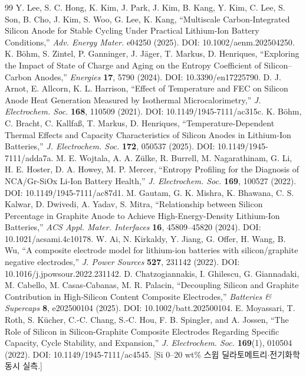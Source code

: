 \begin{thebibliography}{99}
 Y. Lee, S. C. Hong, K. Kim, J. Park, J. Kim, B. Kang, Y. Kim, C. Lee, S. Son, B. Cho, J. Kim, S. Woo, G. Lee, K. Kang, ``Multiscale Carbon‐Integrated Silicon Anode for Stable Cycling Under Practical Lithium‐Ion Battery Conditions,'' \emph{Adv. Energy Mater.} e04250 (2025). DOI: 10.1002/aenm.202504250.
 K. Böhm, S. Zintel, P. Ganninger, J. Jäger, T. Markus, D. Henriques, ``Exploring the Impact of State of Charge and Aging on the Entropy Coefficient of Silicon–Carbon Anodes,'' \emph{Energies} \textbf{17}, 5790 (2024). DOI: 10.3390/en17225790.
 D. J. Arnot, E. Allcorn, K. L. Harrison, ``Effect of Temperature and FEC on Silicon Anode Heat Generation Measured by Isothermal Microcalorimetry,'' \emph{J. Electrochem. Soc.} \textbf{168}, 110509 (2021). DOI: 10.1149/1945-7111/ac315c.
 K. Böhm, C. Bracht, C. Kallfaß, T. Markus, D. Henriques, ``Temperature-Dependent Thermal Effects and Capacity Characteristics of Silicon Anodes in Lithium-Ion Batteries,'' \emph{J. Electrochem. Soc.} \textbf{172}, 050537 (2025). DOI: 10.1149/1945-7111/adda7a.
 M. E. Wojtala, A. A. Zülke, R. Burrell, M. Nagarathinam, G. Li, H. E. Hoster, D. A. Howey, M. P. Mercer, ``Entropy Profiling for the Diagnosis of NCA/Gr-SiOx Li-Ion Battery Health,'' \emph{J. Electrochem. Soc.} \textbf{169}, 100527 (2022). DOI: 10.1149/1945-7111/ac87d1.
 M. Gautam, G. K. Mishra, K. Bhawana, C. S. Kalwar, D. Dwivedi, A. Yadav, S. Mitra, ``Relationship between Silicon Percentage in Graphite Anode to Achieve High-Energy-Density Lithium-Ion Batteries,'' \emph{ACS Appl. Mater. Interfaces} \textbf{16}, 45809--45820 (2024). DOI: 10.1021/acsami.4c10178.
 W. Ai, N. Kirkaldy, Y. Jiang, G. Offer, H. Wang, B. Wu, ``A composite electrode model for lithium-ion batteries with silicon/graphite negative electrodes,'' \emph{J. Power Sources} \textbf{527}, 231142 (2022). DOI: 10.1016/j.jpowsour.2022.231142.
 D. Chatzogiannakis, I. Ghilescu, G. Giannadaki, M. Cabello, M. Casas‐Cabanas, M. R. Palacin, ``Decoupling Silicon and Graphite Contribution in High‐Silicon Content Composite Electrodes,'' \emph{Batteries \& Supercaps} \textbf{8}, e202500104 (2025). DOI: 10.1002/batt.202500104.
 E. Moyassari, T. Roth, S. K\"ucher, C.-C. Chang, S.-C. Hou, F. B. Spingler, and A. Jossen, ``The Role of Silicon in Silicon-Graphite Composite Electrodes Regarding Specific Capacity, Cycle Stability, and Expansion,'' \emph{J. Electrochem. Soc.} \textbf{169}(1), 010504 (2022). DOI: 10.1149/1945-7111/ac4545. [Si 0--20 wt\% 스윕 딜라토메트리$\cdot$전기화학 동시 실측.]

\end{thebibliography}
